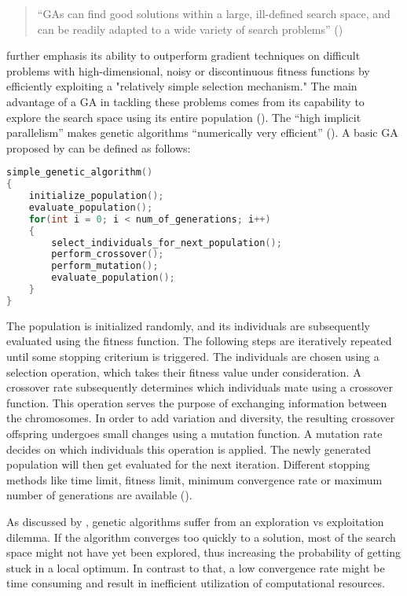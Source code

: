 \begin{quote}
	\begin{em}
		\enquote{GAs can find good solutions within a large, ill-defined search space, and can be readily adapted to a wide variety of search problems} (\cite{mills_determining_2015})
	\end{em}
\end{quote}

\cite{grefenstette_optimization_1986} further emphasis its ability to outperform gradient techniques on difficult problems with high-dimensional, noisy or discontinuous fitness functions by efficiently exploiting a "relatively simple selection mechanism." The main advantage of a GA in tackling these problems comes from its capability to explore the search space using its entire population (\cite{hussain_trade-off_2020}). The \enquote{high implicit parallelism} makes genetic algorithms \enquote{numerically very efficient} (\cite{marsili_libelli_adaptive_2000}). A basic GA proposed by \cite{holland_adaptation_1992} can be defined as follows:

\begin{lstlisting}[language=C, tabsize=4]
simple_genetic_algorithm() 
{
	initialize_population();
	evaluate_population();
	for(int i = 0; i < num_of_generations; i++) 
	{
		select_individuals_for_next_population();
		perform_crossover();
		perform_mutation();
		evaluate_population();
	}
}
\end{lstlisting}

The population is initialized randomly, and its individuals are subsequently evaluated using the fitness function. The following steps are iteratively repeated until some stopping criterium is triggered. The individuals are chosen using a selection operation, which takes their fitness value under consideration. A crossover rate subsequently determines which individuals mate using a crossover function. This operation serves the purpose of exchanging information between the chromosomes. In order to add variation and diversity, the resulting crossover offspring undergoes small changes using a mutation function. A mutation rate decides on which individuals this operation is applied. The newly generated population will then get evaluated for the next iteration. Different stopping methods like time limit, fitness limit, minimum convergence rate or maximum number of generations are available (\cite{majumdar_genetic_2015}).

As discussed by \cite{hussain_trade-off_2020}, genetic algorithms suffer from an exploration vs exploitation dilemma. If the algorithm converges too quickly to a solution, most of the search space might not have yet been explored, thus increasing the probability of getting stuck in a local optimum.
In contrast to that, a low convergence rate might be time consuming and result in inefficient utilization of computational resources.

